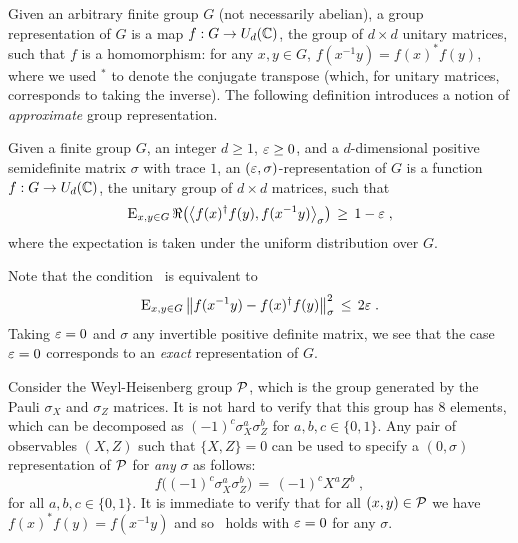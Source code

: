 Given an arbitrary finite group $G$ (not necessarily abelian), a group representation of $G$ is a map $f:G \to U_d(\mathbb{C})$, the group of $d\times d$ unitary matrices, such that $f$ is a homomorphism: for any $x,y\in G$, $f(x^{-1}y)=f(x)^* f(y)$, where we used $^*$ to denote the conjugate transpose (which, for unitary matrices, corresponds to taking the inverse). The following definition introduces a notion of \emph{approximate} group representation.  

\begin{definition}
\label{def:approx-rep}
Given a finite group $G$, an integer $d\geq 1$, $\varepsilon\geq 0$, and a $d$-dimensional positive semidefinite matrix $\sigma$ with trace $1$, an $(\varepsilon,\sigma)$-representation of $G$ is a function $f: G \to U_d(\mathbb{C})$, the unitary group of $d\times d$ matrices, such that 
\begin{equation}
\label{eq:gh-condition}
\textsc{E}_{x,y\in G} \,\Re\big(\big\langle f(x)^\dagger f(y) ,f(x^{-1}y) \big\rangle_\sigma\big) \,\geq\, 1-\varepsilon\;,
\end{equation} 
where the expectation is taken under the uniform distribution over $G$.
\end{definition}

Note that the condition~ is equivalent to 
\begin{equation}
\label{eq:gh-condition-2}
\textsc{E}_{x,y\in G} \, \big\| f(x^{-1}y) - f(x)^\dagger f(y) \big\|_\sigma^2 \,\leq\, 2\varepsilon\;.
\end{equation}
Taking $\varepsilon=0$ and $\sigma$ any invertible positive definite matrix, we see that the case $\varepsilon=0$ corresponds to an \emph{exact} representation of $G$. 

\begin{example}
\label{ex:wh-1}
Consider the Weyl-Heisenberg group $\mathcal{P}$, which is the group generated by the Pauli $\sigma_X$ and $\sigma_Z$ matrices. It is not hard to verify that this group has $8$ elements, which can be decomposed as $(-1)^c \sigma_X^a \sigma_Z^b$ for $a,b,c\in\{0,1\}$. Any pair of observables $(X,Z)$ such that $\{X,Z\}=0$ can be used to specify a $(0,\sigma)$ representation of $\mathcal{P}$ for \emph{any} $\sigma$ as follows:
\begin{equation}
\label{eq:def-rep-pauli}
 f\big((-1)^c \sigma_X^a \sigma_Z^b\big) \,=\, (-1)^c X^a Z^b\;,
\end{equation}
for all $a,b,c\in\{0,1\}$. It is immediate to verify that for all $(x,y)\in \mathcal{P}$ we have $f(x)^*f(y)=f(x^{-1}y)$ and so~ holds with $\varepsilon=0$ for any $\sigma$.
\end{example}

